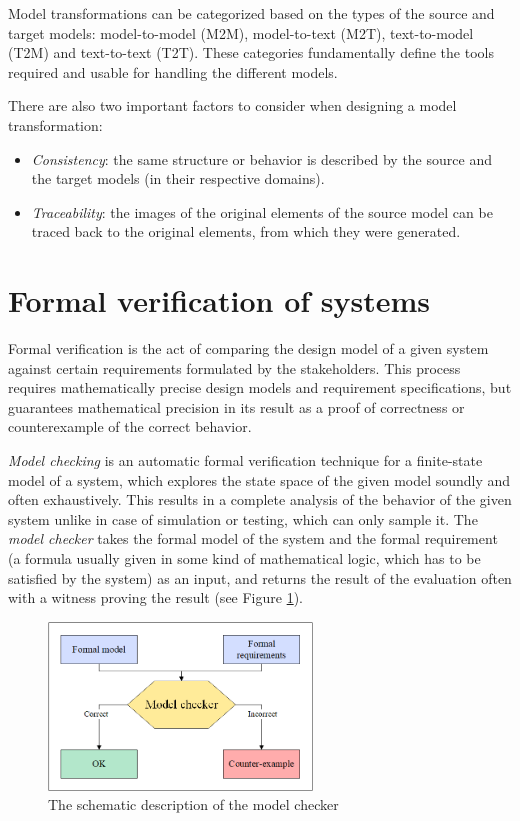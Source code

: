 Model transformations can be categorized based on the types of the source and target models: model-to-model (M2M), model-to-text (M2T), text-to-model (T2M) and text-to-text (T2T). These categories fundamentally define the tools required and usable for handling the different models.

There are also two important factors to consider when designing a model transformation: 
\begin{itemize}
	\item \textit{Consistency}: the same structure or behavior is described by the source and the target models (in their respective domains).
	\item \textit{Traceability}: the images of the original elements of the source model can be traced back to the original elements, from which they were generated.
\end{itemize}

\section{Formal verification of systems} \label{section_background_FORM}

Formal verification is the act of comparing the design model of a given system against certain requirements formulated by the stakeholders. This process requires mathematically precise design models and requirement specifications, but guarantees mathematical precision in its result as a proof of correctness or counterexample of the correct behavior.

\textit{Model checking} \cite{ModelCheckingClarkeGrumberg} is an automatic formal verification technique for a finite-state model of a system, which explores the state space of the given model soundly and often exhaustively. This results in a complete analysis of the behavior of the given system unlike in case of simulation or testing, which can only sample it.
The \textit{model checker} takes the formal model of the system and the formal requirement (a formula usually given in some kind of mathematical logic, which has to be satisfied by the system)  as an input, and returns the result of the evaluation often with a witness proving the result (see Figure \ref{fig:modelChecker}).
\begin{figure}[!ht]
	\centering
	\includegraphics[width=70mm, keepaspectratio]{figures/modelChecker.png}
	\caption{The schematic description of the model checker}
	\label{fig:modelChecker}
\end{figure}

